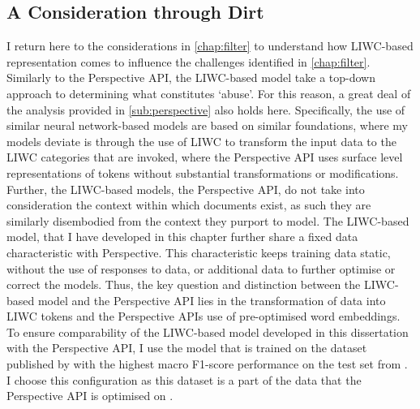   
\subsection{A Consideration through Dirt}\label{sub:LIWC_model}  
I return here to the considerations in \cref{chap:filter} to understand how LIWC-based representation comes to influence the challenges identified in \cref{chap:filter}.  
Similarly to the Perspective API, the LIWC-based model take a top-down approach to determining what constitutes `abuse'. For this reason, a great deal of the analysis provided in \cref{sub:perspective} also holds here.  
Specifically, the use of similar neural network-based models are based on similar foundations, where my models deviate is through the use of LIWC \cite{Pennebaker:2001} to transform the input data to the LIWC categories that are invoked, where the Perspective API uses surface level representations of tokens without substantial transformations or modifications.  
Further, the LIWC-based models,  the Perspective API, do not take into consideration the context within which documents exist, as such they are similarly disembodied from the context they purport to model.  
The LIWC-based model, that I have developed in this chapter further share a fixed data characteristic with Perspective.  
This characteristic keeps training data static, without the use of responses to data, or additional data to further optimise or correct the models.  
Thus, the key question and distinction between the LIWC-based model and the Perspective API lies in the transformation of data into LIWC tokens and the Perspective APIs use of pre-optimised word embeddings.  
To ensure comparability of the LIWC-based model developed in this dissertation with the Perspective API, I use the model that is trained on the dataset published by \citet{Wulczyn:2017} with the highest macro F1-score performance on the test set from \citet{Wulczyn:2017}.  
I choose this configuration as this dataset is a part of the data that the Perspective API is optimised on \citep{Perspective:Github}.  
  
